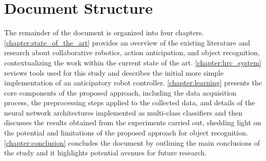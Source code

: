 \section{Document Structure}

The remainder of the document is organized into four chapters. \autoref{chapter:state_of_the_art} provides an overview of the existing literature and research about collaborative robotics, action anticipation, and object recognition,  contextualizing the work within the current state of the art. \autoref{chapter:hrc_system} reviews tools used for this study and describes the initial more simple implementation of an anticipatory robot controller. \autoref{chapter:learning} presents the core components of the proposed approach, including the data acquisition process, the preprocessing steps applied to the collected data, and details of the neural network architectures implemented as multi-class classifiers and then discusses the results obtained from the experiments carried out, shedding light on the potential and limitations of the proposed approach for object recognition. \autoref{chapter:conclusion} concludes the document by outlining the main conclusions of the study and it highlights potential avenues for future research.
